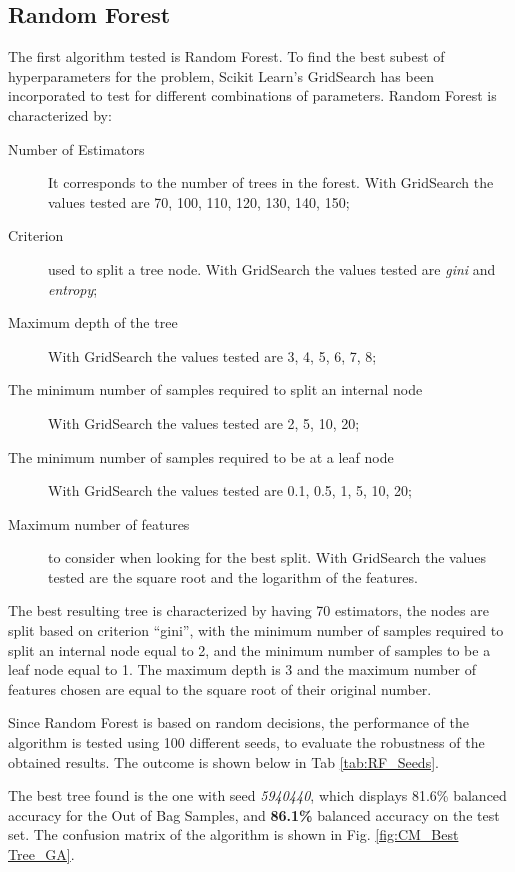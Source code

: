 \subsection{Random Forest}
The first algorithm tested is Random Forest. 
To find the best subest of hyperparameters for the problem, Scikit Learn's GridSearch has been incorporated to test for different combinations of parameters.
Random Forest is characterized by:
\begin{description}
    \item[Number of Estimators] It corresponds to the number of trees in the forest. With GridSearch the values tested are 70, 100, 110, 120, 130, 140, 150;
    \item[Criterion] used to split a tree node. With GridSearch the values tested are \textit{gini} and \textit{entropy};
    \item[Maximum depth of the tree] With GridSearch the values tested are 3, 4, 5, 6, 7, 8;
    \item[The minimum number of samples required to split an internal node]  With GridSearch the values tested are 2, 5, 10, 20;
    \item[The minimum number of samples required to be at a leaf node]  With GridSearch the values tested are 0.1, 0.5, 1, 5, 10, 20;
    \item[Maximum number of features]  to consider when looking for the best split. With GridSearch the values tested are the square root and the logarithm of the features.
\end{description}

The best resulting tree is characterized by having 70 estimators, the nodes are split based on criterion \enquote{gini}, with the minimum number of samples required to split an internal node equal to 2, and the minimum number of samples to be a leaf node equal to 1. The maximum depth is 3 and the maximum number of features chosen are equal to the square root of their original number.

Since Random Forest is based on random decisions, the performance of the algorithm is tested using 100 different seeds, to evaluate the robustness of the obtained results. The outcome is shown below in Tab \ref{tab:RF_Seeds}.


The best tree found is the one with seed \textit{5940440}, which displays 81.6\% balanced accuracy for the Out of Bag Samples, and \textbf{86.1\%} balanced accuracy on the test set.
The confusion matrix of the algorithm is shown in Fig. \ref{fig:CM_Best Tree_GA}.

